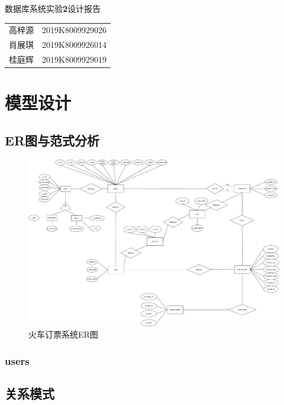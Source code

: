 \documentclass[UTF-8,twoside,cs4size]{ctexart}
\begin{document}
	\begin{center}
		\heiti{}
		数据库系统实验\textbf{2}设计报告
	\end{center}

	\begin{table}[!h]
        \raggedleft
        \begin{tabular}{rc}
            高梓源 & 2019K8009929026\\
            肖展琪 & 2019K8009926014\\
            桂庭辉 & 2019K8009929019
        \end{tabular}
    \end{table}
    
    \section{模型设计}
    \subsection{\textbf{ER}图与范式分析}
    
    \begin{figure}[!h]
        \centering
        \includegraphics*[width=\textwidth]{RE_2.pdf}
        \caption{火车订票系统ER图}
    \end{figure}
    
    \subsubsection{\textbf{users}}
    
    
    \subsection{关系模式}
    
\end{document}
